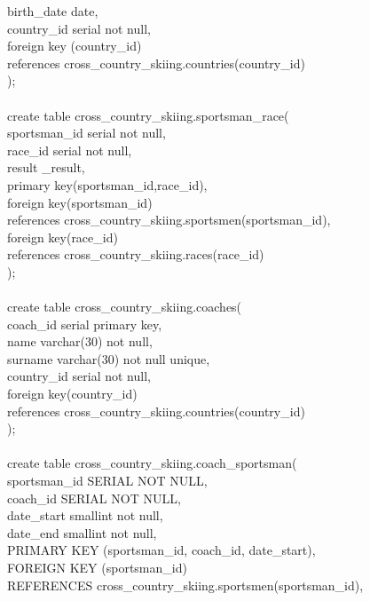 \documentclass[a4paper,12pt]{article}
\begin{document}
\indent birth\_date date,\\
\indent country\_id serial not null,\\
\indent foreign key (country\_id)\\
\indent \indent references cross\_country\_skiing.countries(country\_id)\\
);\\
\\
create table cross\_country\_skiing.sportsman\_race(\\
\indent sportsman\_id serial not null,\\
\indent race\_id serial not null,\\
\indent result \_result,\\
\indent primary key(sportsman\_id,race\_id),\\
\indent foreign key(sportsman\_id)\\
\indent \indent references cross\_country\_skiing.sportsmen(sportsman\_id),\\
\indent foreign key(race\_id)\\
\indent \indent references cross\_country\_skiing.races(race\_id)\\
);\\
\\
create table cross\_country\_skiing.coaches(\\
\indent coach\_id serial primary key,\\
\indent name varchar(30) not null,\\
\indent surname varchar(30) not null unique,\\
\indent country\_id serial not null,\\
\indent foreign key(country\_id)\\
\indent \indent references cross\_country\_skiing.countries(country\_id)\\
);\\
\\
create table cross\_country\_skiing.coach\_sportsman(\\
\indent sportsman\_id SERIAL NOT NULL,\\
\indent coach\_id SERIAL NOT NULL,\\
\indent date\_start smallint not null,\\
\indent date\_end smallint not null,\\
\indent PRIMARY KEY (sportsman\_id, coach\_id, date\_start),\\
\indent FOREIGN KEY (sportsman\_id)\\
\indent \indent REFERENCES cross\_country\_skiing.sportsmen(sportsman\_id),\\
\end{document}
